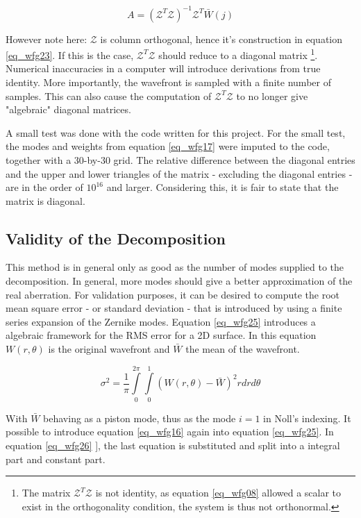 \documentclass{article}
\begin{document}
\begin{equation}
A = \left(\mathcal{Z}^T \mathcal{Z} \right)^{-1} \mathcal{Z}^T \bar{W}(j)
\label{eq_wfg24}
\end{equation}

However note here: $\mathcal{Z}$ is column orthogonal, hence it's construction in equation \ref{eq_wfg23}. If this is the case, $\mathcal{Z}^T \mathcal{Z}$ should reduce to a diagonal matrix \footnote{The matrix $\mathcal{Z}^T \mathcal{Z}$ is not identity, as equation \ref{eq_wfg08} allowed a scalar to exist in the orthogonality condition, the system is thus not orthonormal.}. 
Numerical inaccuracies in a computer will introduce derivations from true identity. More importantly, the wavefront is sampled with a finite number of samples. This can also cause the computation of $\mathcal{Z}^T \mathcal{Z}$ to no longer give "algebraic" diagonal matrices.

A small test was done with the code written for this project. For the small test, the modes and weights from equation \ref{eq_wfg17} were imputed to the code, together with a 30-by-30 grid. The relative difference between the diagonal entries and the upper and lower triangles of the matrix - excluding the diagonal entries - are in the order of $10^{16}$ and larger. Considering this, it is fair to state that the matrix is diagonal.

\newpage
\subsection{Validity of the Decomposition}
This method is in general only as good as the number of modes supplied to the decomposition. In general, more modes should give a better approximation of the real aberration. For validation purposes, it can be desired to compute the root mean square error - or standard deviation - that is introduced by using a finite series expansion of the Zernike modes. Equation \ref{eq_wfg25} \cite{zernikeMatlab} introduces  a algebraic framework for the RMS error for a 2D surface. In this equation $W(r,\theta)$ is the original wavefront and $\bar{W}$ the mean of the wavefront.

\begin{equation}
\sigma^2 = \frac{1}{\pi} \int \limits_0^{2 \pi} \int \limits_0^1 \left(W(r,\theta) - \bar{W} \right)^2 r dr d\theta
\label{eq_wfg25}
\end{equation}

With $\bar{W}$ behaving as a piston mode, thus as the mode $i = 1$ in Noll's indexing. It possible to introduce equation \ref{eq_wfg16} again into equation \ref{eq_wfg25}. In equation \ref{eq_wfg26} ], the last equation is substituted and split into a integral part and constant part.
\end{document}
